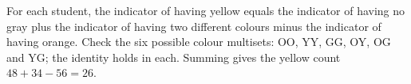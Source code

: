 For each student, the indicator of having yellow equals the indicator of having no gray plus the indicator of having two different colours minus the indicator of having orange. Check the six possible colour multisets: OO, YY, GG, OY, OG and YG; the identity holds in each. Summing gives the yellow count $48+34-56=\boxed{26}$.
